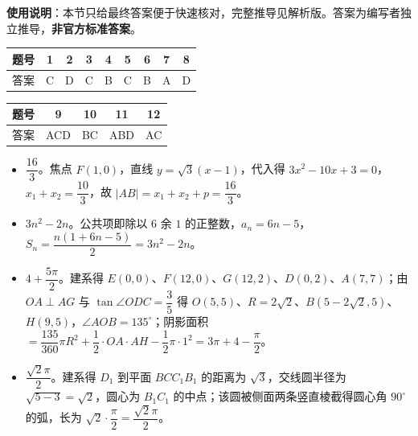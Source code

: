 
\begin{gknotice}
\textbf{使用说明}：本节只给最终答案便于快速核对，完整推导见解析版。答案为编写者独立推导，\textbf{非官方标准答案}。
\end{gknotice}

\begin{center}\begin{tabular}{ccccccccc}
\toprule
题号 & 1 & 2 & 3 & 4 & 5 & 6 & 7 & 8 \\
\midrule
答案 & C & D & C & B & C & B & A & D \\
\bottomrule
\end{tabular}\end{center}

\begin{center}\begin{tabular}{ccccc}
\toprule
题号 & 9 & 10 & 11 & 12 \\
\midrule
答案 & ACD & BC & ABD & AC \\
\bottomrule
\end{tabular}\end{center}

\begin{itemize}[leftmargin=2.6em]
  \item[\textbf{13.}] $\dfrac{16}3$。焦点 $F(1,0)$，直线 $y=\sqrt3(x-1)$，代入得 $3x^2-10x+3=0$，$x_1+x_2=\dfrac{10}3$，故 $|AB|=x_1+x_2+p=\dfrac{16}3$。
  \item[\textbf{14.}] $3n^2-2n$。公共项即除以 $6$ 余 $1$ 的正整数，$a_n=6n-5$，$S_n=\dfrac{n(1+6n-5)}2=3n^2-2n$。
  \item[\textbf{15.}] $4+\dfrac{5\pi}2$。建系得 $E(0,0)$、$F(12,0)$、$G(12,2)$、$D(0,2)$、$A(7,7)$；由 $OA\perp AG$ 与 $\tan\angle ODC=\dfrac35$ 得 $O(5,5)$、$R=2\sqrt2$、$B\left(5-2\sqrt2,5\right)$、$H(9,5)$，$\angle AOB=135^\circ$；阴影面积 $=\dfrac{135}{360}\pi R^2+\dfrac12\cdot OA\cdot AH-\dfrac12\pi\cdot1^2=3\pi+4-\dfrac\pi2$。
  \item[\textbf{16.}] $\dfrac{\sqrt2\pi}2$。建系得 $D_1$ 到平面 $BCC_1B_1$ 的距离为 $\sqrt3$，交线圆半径为 $\sqrt{5-3}=\sqrt2$，圆心为 $B_1C_1$ 的中点；该圆被侧面两条竖直棱截得圆心角 $90^\circ$ 的弧，长为 $\sqrt2\cdot\dfrac\pi2=\dfrac{\sqrt2\pi}2$。
\end{itemize}

